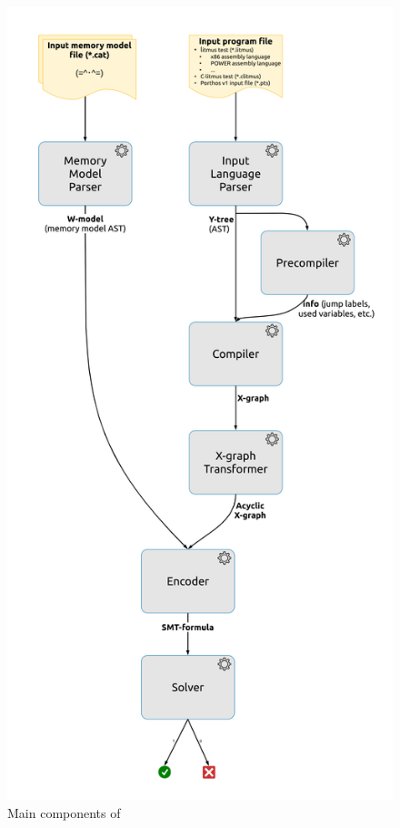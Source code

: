 \begin{figure}%
  \centering
  \includegraphics[width=\textwidth,height=\textheight,keepaspectratio]{img/my/lucidchart.com/data-flow-vert-300dpi.png}
  \caption{Main components of \porthos[2]}
  \label{fig:arch}
\end{figure}


